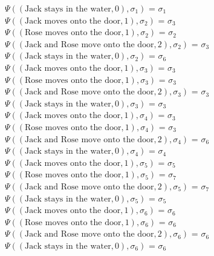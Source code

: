 \documentclass[a4paper]{article}
\begin{document}
$\Psi((\text{Jack stays in the water},0),\sigma_1)$ = $\sigma_1$ \\[0.7\baselineskip] 
$\Psi((\text{Jack moves onto the door},1),\sigma_2)$ = $\sigma_3$ \\[0.1\baselineskip] 
$\Psi((\text{Rose moves onto the door},1),\sigma_2)$ = $\sigma_2$ \\[0.1\baselineskip] 
$\Psi((\text{Jack and Rose move onto the door},2),\sigma_2)$ = $\sigma_3$ \\[0.1\baselineskip] 
$\Psi((\text{Jack stays in the water},0),\sigma_2)$ = $\sigma_6$ \\[0.7\baselineskip] 
$\Psi((\text{Jack moves onto the door},1),\sigma_3)$ = $\sigma_3$ \\[0.1\baselineskip] 
$\Psi((\text{Rose moves onto the door},1),\sigma_3)$ = $\sigma_3$ \\[0.1\baselineskip] 
$\Psi((\text{Jack and Rose move onto the door},2),\sigma_3)$ = $\sigma_3$ \\[0.1\baselineskip]
$\Psi((\text{Jack stays in the water},0),\sigma_3)$ = $\sigma_3$ \\[0.7\baselineskip] 
$\Psi((\text{Jack  moves onto the door},1),\sigma_4)$ = $\sigma_3$ \\[0.1\baselineskip] 
$\Psi((\text{Rose moves onto the door},1),\sigma_4)$ = $\sigma_3$ \\[0.1\baselineskip] 
$\Psi((\text{Jack and Rose move onto the door},2),\sigma_4)$ = $\sigma_6$ \\[0.1\baselineskip]
$\Psi((\text{Jack stays in the water},0),\sigma_4)$ = $\sigma_4$ \\[0.7\baselineskip] 
$\Psi((\text{Jack moves onto the door},1),\sigma_5)$ = $\sigma_5$ \\[0.1\baselineskip] 
$\Psi((\text{Rose moves onto the door},1),\sigma_5)$ = $\sigma_7$ \\[0.1\baselineskip] 
$\Psi((\text{Jack and Rose move onto the door},2),\sigma_5)$ = $\sigma_7$ \\[0.1\baselineskip]
$\Psi((\text{Jack stays in the water},0),\sigma_5)$ = $\sigma_5$ \\[0.7\baselineskip] 
$\Psi((\text{Jack moves onto the door},1),\sigma_6)$ = $\sigma_6$ \\[0.1\baselineskip] 
$\Psi((\text{Rose moves onto the door},1),\sigma_6)$ = $\sigma_6$ \\[0.1\baselineskip] 
$\Psi((\text{Jack and Rose move onto the door},2),\sigma_6)$ = $\sigma_6$ \\[0.1\baselineskip]
$\Psi((\text{Jack stays in the water},0),\sigma_6)$ = $\sigma_6$ \\[0.7\baselineskip] 
\end{document}

